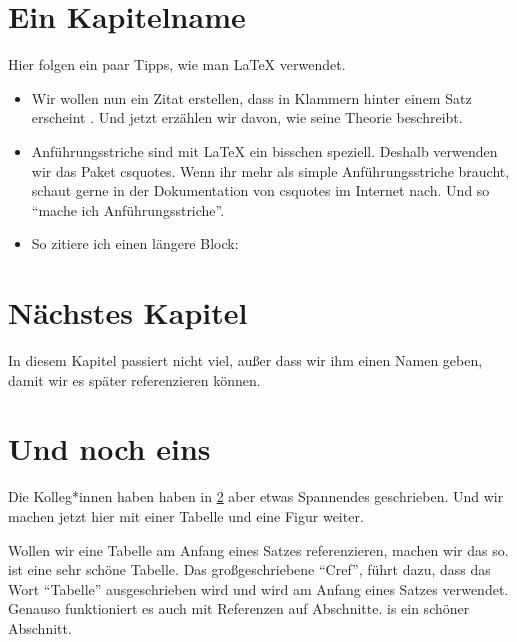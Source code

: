 \documentclass{dsadokumentation}
\begin{document}
\section{Ein Kapitelname}

Hier folgen ein paar Tipps, wie man \LaTeX{} verwendet.

\begin{itemize}
	\item Wir wollen nun ein Zitat erstellen, dass in Klammern hinter einem Satz erscheint \parencite{k4.2.somelabel}. Und jetzt erzählen wir davon, wie \textcite{k4.2.somelabel} seine Theorie beschreibt.

	\item Anführungsstriche sind mit \LaTeX{} ein bisschen speziell. Deshalb verwenden wir das Paket csquotes. Wenn ihr mehr als simple Anführungsstriche braucht, schaut gerne in der Dokumentation von csquotes im Internet nach. Und so \enquote{mache ich Anführungsstriche}.

	\item So zitiere ich einen längere Block: 
\end{itemize}

\section{Nächstes Kapitel}\label{k4.2.ch.einkapitel}

In diesem Kapitel passiert nicht viel, außer dass wir ihm einen Namen geben, damit wir es später referenzieren können.

\section{Und noch eins}

Die Kolleg*innen haben haben in \cref{k4.2.ch.einkapitel} aber etwas Spannendes geschrieben.
Und wir machen jetzt hier mit einer Tabelle und eine Figur weiter.

Wollen wir eine Tabelle am Anfang eines Satzes referenzieren, machen wir das so.  ist eine sehr schöne Tabelle. Das großgeschriebene \enquote{Cref}, führt dazu, dass das Wort \enquote{Tabelle} ausgeschrieben wird und wird am Anfang eines Satzes verwendet. Genauso funktioniert es auch mit Referenzen auf Abschnitte.  is ein schöner Abschnitt.
\end{document}
